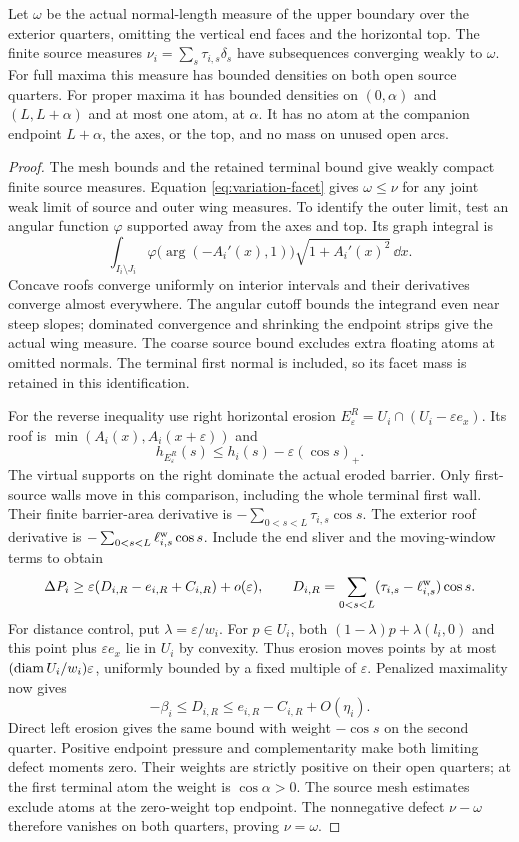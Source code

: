 \begin{theorem}\label{lem:variation-sources}
Let $\omega$ be the actual normal-length measure of the upper boundary
over the exterior quarters, omitting the vertical end faces and the
horizontal top. The finite source measures
$\nu_i=\sum_s\tau_{i,s}\delta_s$ have subsequences converging weakly
to $\omega$. For full maxima this measure has bounded densities
on both open source quarters. For proper maxima it has bounded
densities on $(0,\alpha)$ and $(L,L+\alpha)$ and at most one atom,
at $\alpha$. It has no atom at the companion endpoint $L+\alpha$,
the axes, or the top, and no mass on unused open arcs.
\end{theorem}

\begin{proof}
The mesh bounds and the retained terminal bound give weakly compact
finite source measures. Equation \eqref{eq:variation-facet} gives
$\omega\le\nu$ for any joint weak limit of source and outer
wing measures. To identify the outer limit, test an angular function
$\varphi$ supported away from the axes and top. Its graph integral is
\[
 \int_{I_i\setminus J_i}
 \varphi\bigl(\arg(-A_i'(x),1)\bigr)\sqrt{1+A_i'(x)^2}\,\dd x.
\]
Concave roofs converge uniformly on interior intervals and their
derivatives converge almost everywhere. The angular cutoff bounds
the integrand even near steep slopes; dominated convergence and
shrinking the endpoint strips give the actual wing measure.
The coarse source bound excludes extra floating atoms at omitted
normals. The terminal first normal is included, so its facet mass
is retained in this identification.

For the reverse inequality use right horizontal erosion
$E^R_\varepsilon=U_i\cap(U_i-\varepsilon e_x)$.
Its roof is $\min(A_i(x),A_i(x+\varepsilon))$ and
\[
 h_{E^R_\varepsilon}(s)\le h_i(s)-\varepsilon(\cos s)_+.
\]
The virtual supports on the right dominate the actual eroded
barrier. Only first-source walls move in this comparison, including
the whole terminal first wall. Their finite barrier-area derivative
is $-\sum_{0<s<L}\tau_{i,s}\cos s$.
The exterior roof derivative is
$-\sum_{0<s<L}\ell^{\rm w}_{i,s}\cos s$.
Include the end sliver and the moving-window terms to obtain
\[
 \Delta P_i\ge\varepsilon(D_{i,R}-e_{i,R}+C_{i,R})+o(\varepsilon),
 \qquad D_{i,R}=\sum_{0<s<L}(\tau_{i,s}-\ell^{\rm w}_{i,s})\cos s.
\]
For distance control, put $\lambda=\varepsilon/w_i$. For $p\in U_i$,
both $(1-\lambda)p+\lambda(l_i,0)$ and this point plus
$\varepsilon e_x$ lie in $U_i$ by convexity. Thus erosion moves
points by at most $(\operatorname{diam} U_i/w_i)\varepsilon$, uniformly bounded
by a fixed multiple of $\varepsilon$.
Penalized maximality now gives
\[
 -\beta_i\le D_{i,R}\le e_{i,R}-C_{i,R}+O(\eta_i).
\]
Direct left erosion gives the same bound with weight $-\cos s$ on
the second quarter. Positive endpoint pressure and complementarity
make both limiting defect moments zero. Their weights are strictly
positive on their open quarters; at the first terminal atom the
weight is $\cos\alpha>0$. The source mesh estimates exclude atoms
at the zero-weight top endpoint. The nonnegative defect $\nu-\omega$
therefore vanishes on both quarters, proving $\nu=\omega$.
\end{proof}

